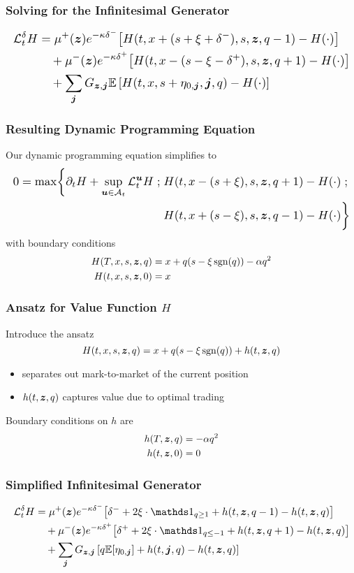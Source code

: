 \begin{frame}
\frametitle{Solving for the Infinitesimal Generator}
\[
\resizebox{\textwidth}{!}{$\displaystyle
\begin{aligned}
\cL^{\delta}_t H & = \mu^+(\bz) e^{ -\kappa \delta^{-}} \bigl[ H(t,x+(s+\xi+\delta^-),s,\bz,q-1) - H(\cdot) \bigr] \\
& \quad + \mu^-(\bz) e^{ -\kappa \delta^{+}} \bigl[ H(t,x-(s-\xi-\delta^+),s,\bz,q+1) - H(\cdot) \bigr] \\
& \quad + \sum_{\bj} G_{\bz,\bj} \E \left[ H(t,x,s+\eta_{0,\bj},\bj,q) - H(\cdot) \right]
\end{aligned}
$}
\]
\end{frame}

\begin{frame}
\frametitle{Resulting Dynamic Programming Equation}
Our dynamic programming equation simplifies to
\[
\resizebox{\textwidth}{!}{$\displaystyle
\begin{aligned}
0 = \max \biggl\lbrace \partial_t H + \sup \limits_{\bu \in \cA_t} \cL^{\bu}_t H \; ; \; & H(t,x-(s+\xi), s, \bz, q+1) - H(\cdot) \; ; \\
&  H(t,x+(s-\xi), s, \bz, q-1) - H(\cdot) \biggr\rbrace
\end{aligned}
$}
\]
with boundary conditions
\begin{align*}
H(T, x, s, \bm{z}, q) & = x + q(s - \xi \operatorname{\mathrm{sgn}} (q)) - \alpha q^2 \\
H(t, x, s, \bm{z}, 0) & = x
\end{align*}
\end{frame}

\begin{frame}
\frametitle{Ansatz for Value Function $H$}
Introduce the ansatz 
 \[ H(t, x, s, \bm{z}, q) = x + q(s - \xi \operatorname{\mathrm{sgn}}(q)) + h(t,\bm{z},q) \]
\begin{itemize}
\item separates out mark-to-market of the current position
\item $h(t,\bm{z},q)$ captures value due to optimal trading
\end{itemize}
Boundary conditions on $h$ are
\begin{align*}
h(T, \bm{z}, q) & = - \alpha q^2 \\
h(t, \bm{z}, 0) & = 0
\end{align*}
\end{frame}

\begin{frame}
\frametitle{Simplified Infinitesimal Generator}
\[
\resizebox{\textwidth}{!}{$\displaystyle
\begin{aligned}
\cL^{\delta}_t H & = \mu^+(\bz) e^{ -\kappa \delta^{-}} \bigl[ \delta^- + 2 \xi \cdot \indicator_{q \geq 1} + h(t,\bz,q-1) - h(t,\bz,q) \bigr] \\
& \quad + \mu^-(\bz) e^{ -\kappa \delta^{+}} \bigl[ \delta^+ + 2 \xi \cdot \indicator_{q \leq -1} + h(t,\bz,q+1) - h(t,\bz,q) \bigr] \\
& \quad + \sum_{\bj} G_{\bz,\bj} \left[q \E [\eta_{0,\bj}] +h(t,\bj,q) - h(t,\bz, q) \right]
\end{aligned}
$}
\]
\end{frame}

